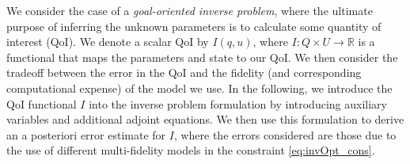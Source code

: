 \documentclass[review]{siamart0516}
\newcommand{\R}{{\mathbb{R}}}
\begin{document}
We consider the case of a {\em goal-oriented inverse problem}, where the ultimate purpose of inferring the unknown parameters is to calculate some quantity of interest (QoI). We denote a scalar QoI by $I(q,u)$, where $I:Q\times U\to\R$ is a functional that maps the parameters and state to our QoI. We then consider the tradeoff between the error in the QoI and the fidelity (and corresponding computational expense) of the model we use. In the following, we introduce the QoI functional $I$ into the inverse problem formulation by introducing auxiliary variables and additional adjoint equations. We then use this formulation to derive an a posteriori error estimate for $I$, where the errors considered are those due to the use of different multi-fidelity models in the constraint \cref{eq:invOpt_cons}.
%
\end{document}
